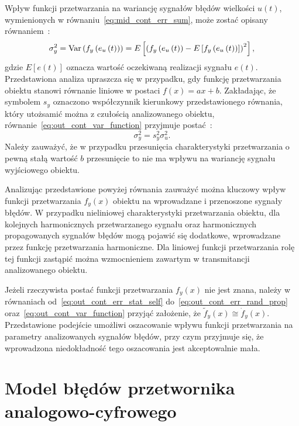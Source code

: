 Wpływ funkcji przetwarzania na wariancję sygnałów błędów wielkości $u(t)$, wymienionych w równaniu~\eqref{eq:mid_cont_err_sum}, może zostać opisany równaniem~\cite{oppenheim_sns}:
\begin{equation}
\sigma_{y}^{2} = \text{Var}\left(f_{y} \left(e_{u} \left(t\right)\right)\right) = E \left[ \left( f_{y} \left(e_{u} \left(t\right)\right) - E \left[ f_{y} \left(e_{u} \left(t\right)\right) \right] \right)^2 \right] \label{eq:out_cont_var_function},
\end{equation}
gdzie $E[e(t)]$ oznacza wartość oczekiwaną realizacji sygnału $e(t)$. Przedstawiona analiza upraszcza się w przypadku, gdy funkcję przetwarzania obiektu stanowi równanie liniowe w postaci $f(x) = ax + b$. Zakładając, że symbolem $s_{y}$ oznaczono współczynnik kierunkowy przedstawionego równania, który utożsamić można z czułością analizowanego obiektu, równanie~\eqref{eq:out_cont_var_function} przyjmuje postać~\cite{oppenheim_sns}:
\begin{equation}
\sigma_{y}^{2} = s_{y}^{2} \sigma_{u}^{2} \label{eq:out_cont_var_sense}.
\end{equation}
Należy zauważyć, że w przypadku przesunięcia charakterystyki przetwarzania o pewną stałą wartość $b$ przesunięcie to nie ma wpływu na wariancję sygnału wyjściowego obiektu.

Analizując przedstawione powyżej równania zauważyć można kluczowy wpływ funkcji przetwarzania $f_{y}(x)$ obiektu na wprowadzane i przenoszone sygnały błędów. W przypadku nieliniowej charakterystyki przetwarzania obiektu, dla kolejnych harmonicznych przetwarzanego sygnału oraz harmonicznych propagowanych sygnałów błędów mogą pojawić się dodatkowe, wprowadzane przez funkcję przetwarzania harmoniczne. Dla liniowej funkcji przetwarzania rolę tej funkcji zastąpić można wzmocnieniem zawartym w transmitancji analizowanego obiektu.

Jeżeli rzeczywista postać funkcji przetwarzania $f_{y}(x)$ nie jest znana, należy w równaniach od~\eqref{eq:out_cont_err_stat_self} do~\eqref{eq:out_cont_err_rand_prop} oraz~\eqref{eq:out_cont_var_function} przyjąć założenie, że $\tilde{f}_{y}(x) \cong \dot{f}_{y}(x)$. Przedstawione podejście umożliwi oszacowanie wpływu funkcji przetwarzania na parametry analizowanych sygnałów błędów, przy czym przyjmuje się, że wprowadzona niedokładność tego oszacowania jest akceptowalnie mała.

\section{Model błędów przetwornika analogowo-cyfrowego}

